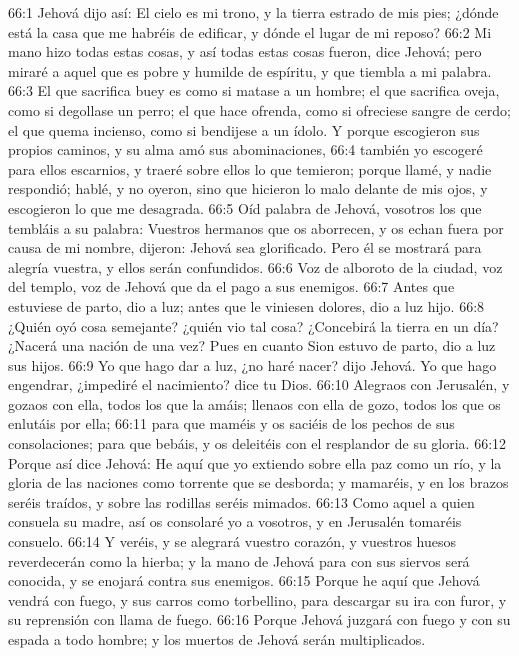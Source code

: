 66:1 Jehová dijo así: El cielo es mi trono, y la tierra estrado de mis pies; ¿dónde está la casa que me habréis de edificar, y dónde el lugar de mi reposo? 
66:2 Mi mano hizo todas estas cosas, y así todas estas cosas fueron, dice Jehová; pero miraré a aquel que es pobre y humilde de espíritu, y que tiembla a mi palabra. 
66:3 El que sacrifica buey es como si matase a un hombre; el que sacrifica oveja, como si degollase un perro; el que hace ofrenda, como si ofreciese sangre de cerdo; el que quema incienso, como si bendijese a un ídolo. Y porque escogieron sus propios caminos, y su alma amó sus abominaciones, 
66:4 también yo escogeré para ellos escarnios, y traeré sobre ellos lo que temieron; porque llamé, y nadie respondió; hablé, y no oyeron, sino que hicieron lo malo delante de mis ojos, y escogieron lo que me desagrada. 
66:5 Oíd palabra de Jehová, vosotros los que tembláis a su palabra: Vuestros hermanos que os aborrecen, y os echan fuera por causa de mi nombre, dijeron: Jehová sea glorificado. Pero él se mostrará para alegría vuestra, y ellos serán confundidos. 
66:6 Voz de alboroto de la ciudad, voz del templo, voz de Jehová que da el pago a sus enemigos. 
66:7 Antes que estuviese de parto, dio a luz; antes que le viniesen dolores, dio a luz hijo. 
66:8 ¿Quién oyó cosa semejante? ¿quién vio tal cosa? ¿Concebirá la tierra en un día? ¿Nacerá una nación de una vez? Pues en cuanto Sion estuvo de parto, dio a luz sus hijos. 
66:9 Yo que hago dar a luz, ¿no haré nacer? dijo Jehová. Yo que hago engendrar, ¿impediré el nacimiento? dice tu Dios. 
66:10 Alegraos con Jerusalén, y gozaos con ella, todos los que la amáis; llenaos con ella de gozo, todos los que os enlutáis por ella; 
66:11 para que maméis y os saciéis de los pechos de sus consolaciones; para que bebáis, y os deleitéis con el resplandor de su gloria. 
66:12 Porque así dice Jehová: He aquí que yo extiendo sobre ella paz como un río, y la gloria de las naciones como torrente que se desborda; y mamaréis, y en los brazos seréis traídos, y sobre las rodillas seréis mimados. 
66:13 Como aquel a quien consuela su madre, así os consolaré yo a vosotros, y en Jerusalén tomaréis consuelo. 
66:14 Y veréis, y se alegrará vuestro corazón, y vuestros huesos reverdecerán como la hierba; y la mano de Jehová para con sus siervos será conocida, y se enojará contra sus enemigos. 
66:15 Porque he aquí que Jehová vendrá con fuego, y sus carros como torbellino, para descargar su ira con furor, y su reprensión con llama de fuego. 
66:16 Porque Jehová juzgará con fuego y con su espada a todo hombre; y los muertos de Jehová serán multiplicados. 
